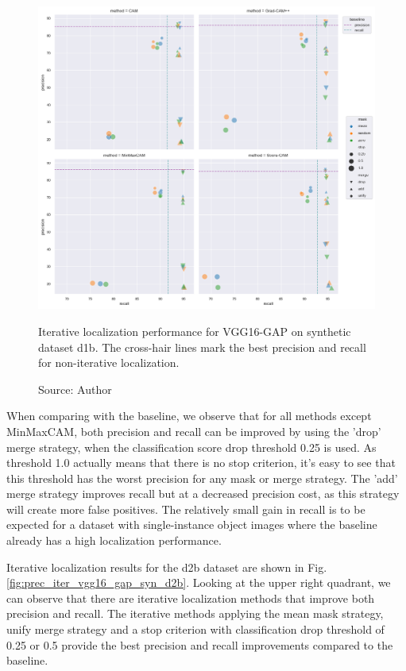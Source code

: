 \begin{figure}[ht]
    \begin{center}       
    \includegraphics[width=1.0\textwidth]{images/fig_iter_vgg16_gap_syn_d1b.png}
    \caption[Iterative localization performance for VGG16-GAP on synthetic dataset d1b]{Iterative localization performance for VGG16-GAP on synthetic dataset d1b. The cross-hair lines mark the best precision and recall for non-iterative localization.}
    \caption*{Source: Author}
    \label{fig:prec_iter_vgg16_gap_syn_d1b}
    \end{center}
\end{figure}

When comparing with the baseline, we observe that for all methods except MinMaxCAM, both precision and recall can be improved by using the 'drop' merge strategy, when the classification score drop threshold 0.25 is used. As threshold 1.0 actually means that there is no stop criterion, it's easy to see that this threshold has the worst precision for any mask or merge strategy. The 'add' merge strategy improves recall but at a decreased precision cost, as this strategy will create more false positives. The relatively small gain in recall is to be expected for a dataset with single-instance object images where the baseline already has a high localization performance.

Iterative localization results for the d2b dataset are shown in Fig. \ref{fig:prec_iter_vgg16_gap_syn_d2b}. Looking at the upper right quadrant, we can observe that there are iterative localization methods that improve both precision and recall. The iterative methods applying the mean mask strategy, unify merge strategy and a stop criterion with classification drop threshold of 0.25 or 0.5 provide the best precision and recall improvements compared to the baseline.

